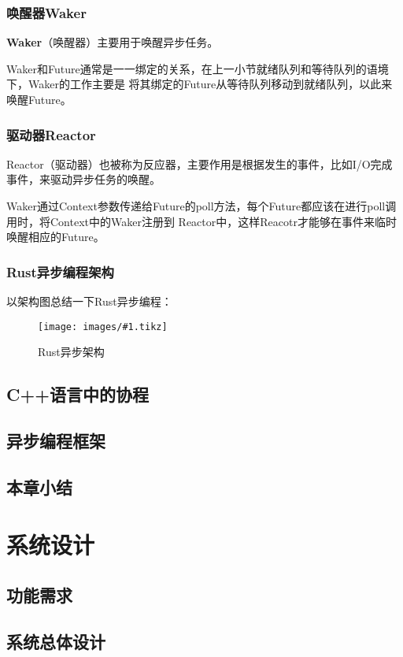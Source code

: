 \documentclass[supercite]{HustGraduPaper}
\newcommand{\cfig}[3]{
  \begin{figure}[htb]
    \centering
    \texttt{[image: images/\#1.tikz]}
    \caption{#3}
    \label{fig:#1}
  \end{figure}
}
\theoremstyle{definition}
\begin{document}
\subsubsection{唤醒器Waker}
\textbf{Waker}（唤醒器）主要用于唤醒异步任务。\par

Waker和Future通常是一一绑定的关系，在上一小节就绪队列和等待队列的语境下，Waker的工作主要是
将其绑定的Future从等待队列移动到就绪队列，以此来唤醒Future。\par

\subsubsection{驱动器Reactor}
Reactor（驱动器）也被称为反应器，主要作用是根据发生的事件，比如I/O完成事件，来驱动异步任务的唤醒。\par

Waker通过Context参数传递给Future的poll方法，每个Future都应该在进行poll调用时，将Context中的Waker注册到
Reactor中，这样Reacotr才能够在事件来临时唤醒相应的Future。\par

\subsubsection{Rust异步编程架构}
以架构图总结一下Rust异步编程：

\cfig{rust-async}{0.9}{Rust异步架构}

\subsection{C++语言中的协程}
\subsection{异步编程框架}
\subsection{本章小结}
\section{系统设计}
\subsection{功能需求}
\subsection{系统总体设计}
\end{document}
